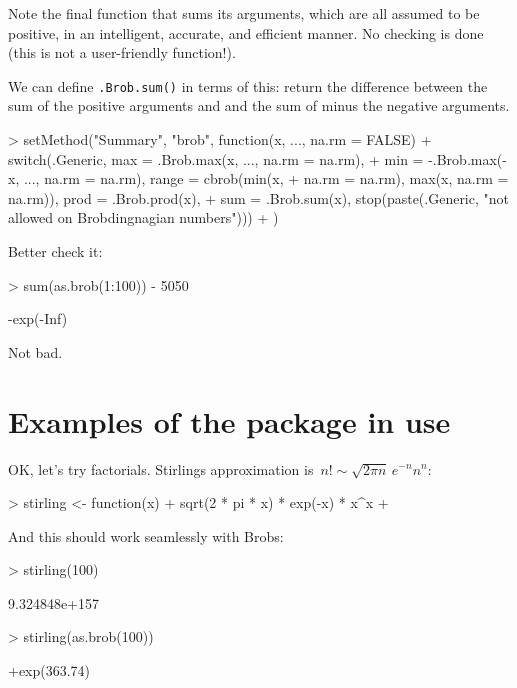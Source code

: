 \documentclass[a4paper]{article}
\begin{document}
Note the final function that sums its arguments, which are all assumed
to be positive, in an intelligent, accurate, and efficient manner.  No
checking is done (this is not a user-friendly function!).

We can define {\tt .Brob.sum()} in terms of this: return the
difference between the sum of the positive arguments and and the sum
of minus the negative arguments.

\begin{Schunk}
\begin{Sinput}
> setMethod("Summary", "brob", function(x, ..., na.rm = FALSE) {
+     switch(.Generic, max = .Brob.max(x, ..., na.rm = na.rm), 
+         min = -.Brob.max(-x, ..., na.rm = na.rm), range = cbrob(min(x, 
+             na.rm = na.rm), max(x, na.rm = na.rm)), prod = .Brob.prod(x), 
+         sum = .Brob.sum(x), stop(paste(.Generic, "not allowed on Brobdingnagian numbers")))
+ })
\end{Sinput}
\end{Schunk}

Better check it:

\begin{Schunk}
\begin{Sinput}
> sum(as.brob(1:100)) - 5050
\end{Sinput}
\begin{Soutput}
[1] -exp(-Inf)
\end{Soutput}
\end{Schunk}

Not bad.


\section{Examples of the package in use}

OK, let's try factorials.  Stirlings approximation is~$n!\sim\sqrt{2\pi
  n}\,e^{-n}n^n$:

\begin{Schunk}
\begin{Sinput}
> stirling <- function(x) {
+     sqrt(2 * pi * x) * exp(-x) * x^x
+ }
\end{Sinput}
\end{Schunk}

And this should work seamlessly with Brobs:


\begin{Schunk}
\begin{Sinput}
> stirling(100)
\end{Sinput}
\begin{Soutput}
[1] 9.324848e+157
\end{Soutput}
\begin{Sinput}
> stirling(as.brob(100))
\end{Sinput}
\begin{Soutput}
[1] +exp(363.74)
\end{Soutput}
\end{Schunk}
\end{document}
